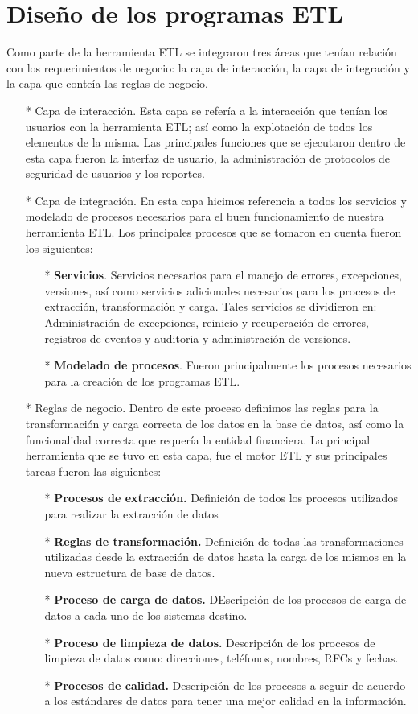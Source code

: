 \documentclass[a4paper,openright,12pt]{book}
\begin{document}
\section{Diseño de los programas ETL}
Como parte de la herramienta ETL se integraron tres áreas que tenían relación con los requerimientos de negocio: la capa de interacción, la capa de integración y la capa que conteía las reglas de negocio.

\begin{itemize}
\item[*] Capa de interacción. Esta capa se refería a la interacción que tenían los usuarios con la herramienta ETL; así como la explotación de todos los elementos de la misma. Las principales funciones que se ejecutaron dentro de esta capa fueron la interfaz de usuario, la administración de protocolos de seguridad de usuarios y los reportes.
\item[*] Capa de integración. En esta capa hicimos referencia a todos los servicios y modelado de procesos necesarios para el buen funcionamiento de nuestra herramienta ETL. Los principales procesos que se tomaron en cuenta fueron los siguientes:
\begin{itemize}
\item[*] \textbf{Servicios}. Servicios necesarios para el manejo de errores, excepciones, versiones, así como servicios adicionales necesarios para los procesos de extracción, transformación y carga. Tales servicios se dividieron en: Administración de excepciones, reinicio y recuperación de errores, registros de eventos y auditoria y administración de versiones.
\item[*] \textbf{Modelado de procesos}. Fueron principalmente los procesos necesarios para la creación de los programas ETL. 
\end{itemize}
\item[*] Reglas de negocio. Dentro de este proceso definimos las reglas para la transformación y carga correcta de los datos en la base de datos, así como la funcionalidad correcta que requería la entidad financiera. La principal herramienta que se tuvo en esta capa, fue el motor ETL y sus principales tareas fueron las siguientes:
\begin{itemize}
\item[*] \textbf{Procesos de extracción.} Definición de todos los procesos utilizados para realizar la extracción de datos
\item[*] \textbf{Reglas de transformación.} Definición de todas las transformaciones utilizadas desde la extracción de datos hasta la carga de los mismos en la nueva estructura de base de datos.
\item[*] \textbf{Proceso de carga de datos.} DEscripción de los procesos de carga de datos a cada uno de los sistemas destino.
\item[*] \textbf{Proceso de limpieza de datos.} Descripción de los procesos de limpieza de datos como: direcciones, teléfonos, nombres, RFCs y fechas.
\item[*] \textbf{Procesos de calidad.} Descripción de los procesos a seguir de acuerdo a los estándares de datos para tener una mejor calidad en la información. 
\end{itemize}
\end{itemize}
\end{document}
